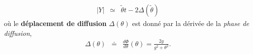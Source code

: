 \begin{eqnarray}
	\vert Y \vert & \simeq & 	\tilde{\theta} t  - 2 \Delta (\tilde{\theta} )
\end{eqnarray}
où le {\bf déplacement de diffusion} $\Delta (\theta)$ est donné par la dérivée de la {\em phase de diffusion},
\begin{eqnarray}\label{eq:I-1-16}
	\Delta ( \theta ) & \doteq & \frac{ d \Phi }{ d \theta } ( \theta )= \frac{ 2 g }{ g^2 + \theta^2} . 	
\end{eqnarray}





